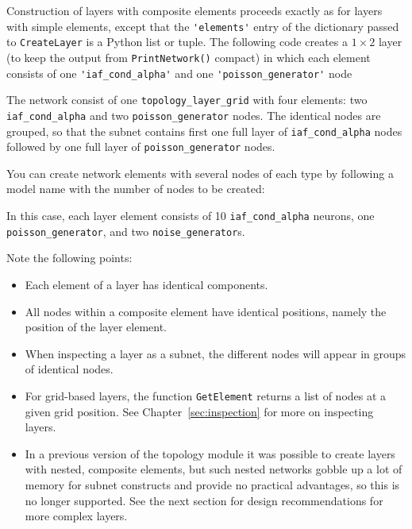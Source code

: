\documentclass[a4paper,12pt]{report}
\begin{document}
Construction of layers with composite elements proceeds exactly as for
layers with simple elements, except that the \lstinline!'elements'!
entry of the dictionary passed to \lstinline!CreateLayer! is a Python
list or tuple. The following code creates a $1\times 2$ layer (to keep
the output from \lstinline!PrintNetwork()! compact) in which
each element consists of one \lstinline!'iaf_cond_alpha'! and one
\lstinline!'poisson_generator'! node
%


%
The network consist of one \lstinline!topology_layer_grid! with four
elements: two \lstinline!iaf_cond_alpha! and two
\lstinline!poisson_generator! nodes. The identical nodes are grouped, so
that the subnet contains first one full layer of \lstinline!iaf_cond_alpha!
nodes followed by one full layer of \lstinline!poisson_generator! nodes.

You can create network elements with several nodes of each type by
following a model name with the number of nodes to be created:
%


%
In this case, each layer element consists of 10
\lstinline!iaf_cond_alpha! neurons, one \lstinline!poisson_generator!,
and two \lstinline!noise_generator!s.

Note the following points:
\begin{itemize}
\item Each element of a layer has identical components.
\item All nodes within a composite element have identical positions,
  namely the position of the layer element.
\item When inspecting a layer as a subnet, the different nodes will appear
  in groups of identical nodes.
\item For grid-based layers, the function \lstinline!GetElement! returns a
  list of nodes at a given grid position. See Chapter~\ref{sec:inspection}
  for more on inspecting layers.
\item In a previous version of the topology module it was possible to
  create layers with nested, composite elements, but such nested networks
  gobble up a lot of memory for subnet constructs and provide no practical
  advantages, so this is no longer supported. See the next section for
  design recommendations for more complex layers.
\end{itemize}
\end{document}
